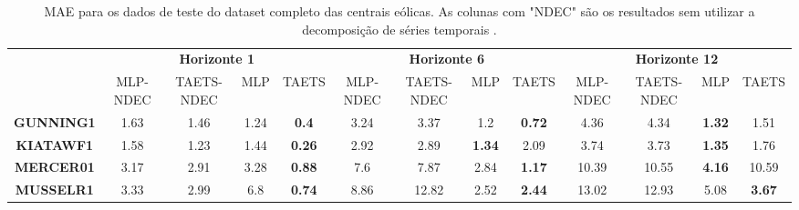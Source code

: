 \begin{table}
\caption{MAE para os dados de teste do dataset completo das centrais eólicas. As colunas com "NDEC" são os resultados sem utilizar a decomposição de séries temporais \cite{CABRAL}.}
\begin{tabular}{|l|l|l|l|l|l|l|l|l|l|l|l|l|}
\hline
\multicolumn{1}{|c|}{\textbf{}} & \multicolumn{4}{|c|}{\textbf{Horizonte 1}} & \multicolumn{4}{|c|}{\textbf{Horizonte 6}} & \multicolumn{4}{|c|}{\textbf{Horizonte 12}} \\
\cline{2-13} 
\multicolumn{1}{|c|}{\textbf{}} & \multicolumn{1}{|c|}{MLP-NDEC} & \multicolumn{1}{|c|}{TAETS-NDEC} & \multicolumn{1}{|c|}{MLP} & \multicolumn{1}{|c|}{TAETS} & \multicolumn{1}{|c|}{MLP-NDEC} & \multicolumn{1}{|c|}{TAETS-NDEC} & \multicolumn{1}{|c|}{MLP} & \multicolumn{1}{|c|}{TAETS} & \multicolumn{1}{|c|}{MLP-NDEC} & \multicolumn{1}{|c|}{TAETS-NDEC} & \multicolumn{1}{|c|}{MLP} & \multicolumn{1}{|c|}{TAETS} \\ \hline
\multicolumn{1}{|c|}{\textbf{GUNNING1}} & \multicolumn{1}{|c|}{1.63} & \multicolumn{1}{|c|}{1.46} & \multicolumn{1}{|c|}{1.24} & \multicolumn{1}{|c|}{\textbf{0.4}} & \multicolumn{1}{|c|}{3.24} & \multicolumn{1}{|c|}{3.37} & \multicolumn{1}{|c|}{1.2} & \multicolumn{1}{|c|}{\textbf{0.72}} & \multicolumn{1}{|c|}{4.36} & \multicolumn{1}{|c|}{4.34} & \multicolumn{1}{|c|}{\textbf{1.32}} & \multicolumn{1}{|c|}{1.51} \\ \hline
\multicolumn{1}{|c|}{\textbf{KIATAWF1}} & \multicolumn{1}{|c|}{1.58} & \multicolumn{1}{|c|}{1.23} & \multicolumn{1}{|c|}{1.44} & \multicolumn{1}{|c|}{\textbf{0.26}} & \multicolumn{1}{|c|}{2.92} & \multicolumn{1}{|c|}{2.89} & \multicolumn{1}{|c|}{\textbf{1.34}} & \multicolumn{1}{|c|}{2.09} & \multicolumn{1}{|c|}{3.74} & \multicolumn{1}{|c|}{3.73} & \multicolumn{1}{|c|}{\textbf{1.35}} & \multicolumn{1}{|c|}{1.76} \\ \hline
\multicolumn{1}{|c|}{\textbf{MERCER01}} & \multicolumn{1}{|c|}{3.17} & \multicolumn{1}{|c|}{2.91} & \multicolumn{1}{|c|}{3.28} & \multicolumn{1}{|c|}{\textbf{0.88}} & \multicolumn{1}{|c|}{7.6} & \multicolumn{1}{|c|}{7.87} & \multicolumn{1}{|c|}{2.84} & \multicolumn{1}{|c|}{\textbf{1.17}} & \multicolumn{1}{|c|}{10.39} & \multicolumn{1}{|c|}{10.55} & \multicolumn{1}{|c|}{\textbf{4.16}} & \multicolumn{1}{|c|}{10.59} \\ \hline
\multicolumn{1}{|c|}{\textbf{MUSSELR1}} & \multicolumn{1}{|c|}{3.33} & \multicolumn{1}{|c|}{2.99} & \multicolumn{1}{|c|}{6.8} & \multicolumn{1}{|c|}{\textbf{0.74}} & \multicolumn{1}{|c|}{8.86} & \multicolumn{1}{|c|}{12.82} & \multicolumn{1}{|c|}{2.52} & \multicolumn{1}{|c|}{\textbf{2.44}} & \multicolumn{1}{|c|}{13.02} & \multicolumn{1}{|c|}{12.93} & \multicolumn{1}{|c|}{5.08} & \multicolumn{1}{|c|}{\textbf{3.67}} \\ \hline

\end{tabular}
\end{table}

